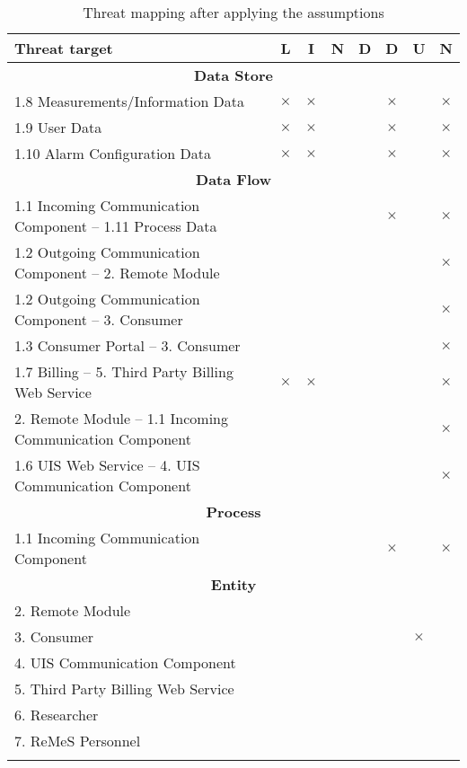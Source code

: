 \begin{center}
	\begin{longtable}{p{9cm}ccccccc}
	\toprule[1pt]
	\bf Threat target & \bf L & \bf I & \bf N & \bf D & \bf D & \bf U & \bf N \\
	\midrule[0.5pt]
	\endhead
	\multicolumn{8}{c}{\textbf{Data Store}} \\
	\midrule[0.5pt]
	\footnotesize 1.8 Measurements/Information Data & $\times$ & $\times$ &  &  & $\times$ &  & $\times$ \\
	\footnotesize 1.9 User Data 					& $\times$ & $\times$ &  &  & $\times$ &  & $\times$ \\
	\footnotesize 1.10 Alarm Configuration Data 	& $\times$ & $\times$ &  &  & $\times$ &  & $\times$ \\
	\midrule[0.5pt]
	\multicolumn{8}{c}{\textbf{Data Flow}} \\
	\midrule[0.5pt]
	\footnotesize 1.1 Incoming Communication Component -- 1.11 Process Data &          &          &  &  & $\times$ & & $\times$ \\
	\footnotesize 1.2 Outgoing Communication Component -- 2. Remote Module 	&          &          &  &  &          & & $\times$ \\
	\footnotesize 1.2 Outgoing Communication Component -- 3. Consumer 		&          &          &  &  &          & & $\times$ \\
	\footnotesize 1.3 Consumer Portal -- 3. Consumer 						& &  &  &  &  & & $\times$ \\
	\footnotesize 1.7 Billing -- 5. Third Party Billing Web Service 		& $\times$ & $\times$ &  &  &          & & $\times$ \\
	\footnotesize 2. Remote Module -- 1.1 Incoming Communication Component  &          &          &  &  &          & & $\times$ \\
	\footnotesize 1.6 UIS Web Service -- 4. UIS Communication Component 	& & &  &  &          & & $\times$ \\
	\midrule[0.5pt]
	\multicolumn{8}{c}{\textbf{Process}} \\
	\midrule[0.5pt]
	\footnotesize 1.1 Incoming Communication Component 	&  &  &  &  & $\times$ & & $\times$ \\
	\midrule[0.5pt]
	\multicolumn{8}{c}{\textbf{Entity}} \\
	\midrule[0.5pt]
	\footnotesize 2. Remote Module 						&  &  &  &  &  &          & \\
	\footnotesize 3. Consumer 							&  &  &  &  &  & $\times$ & \\
	\footnotesize 4. UIS Communication Component 		&  &  &  &  &  &          & \\
	\footnotesize 5. Third Party Billing Web Service 	&  &  &  &  &  &          & \\
	\footnotesize 6. Researcher 						&  &  &  &  &  &          & \\
	\footnotesize 7. ReMeS Personnel 					&  &  &  &  &  &          & \\
	\bottomrule[1pt]
	\caption{Threat mapping after applying the assumptions}
	\label{table:threat-map-reduced}
	\end{longtable}
\end{center}


